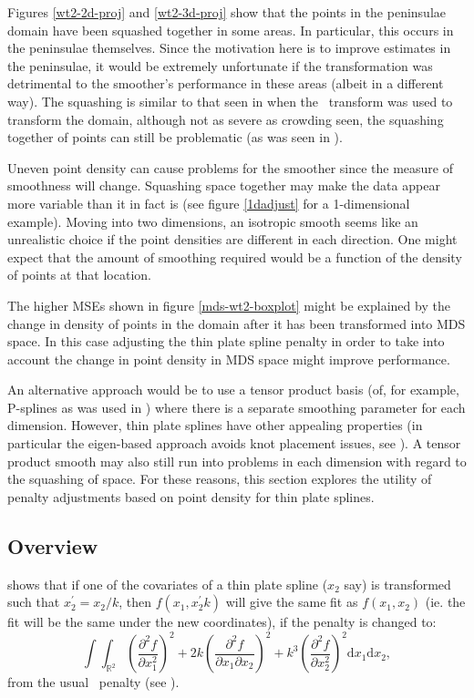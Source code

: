 Figures \ref{wt2-2d-proj} and \ref{wt2-3d-proj} show that the points in the peninsulae domain have been squashed together in some areas. In particular, this occurs in the peninsulae themselves. Since the motivation here is to improve estimates in the peninsulae, it would be extremely unfortunate if the transformation was detrimental to the smoother's performance in these areas (albeit in a different way). The squashing is similar to that seen in  when the \sch\ transform was used to transform the domain, although not as severe as crowding seen, the squashing together of points can still be problematic (as was seen in ). 

Uneven point density can cause problems for the smoother since the measure of smoothness will change.  Squashing space together may make the data appear more variable than it in fact is (see figure \ref{1dadjust} for a 1-dimensional example). Moving into two dimensions, an isotropic smooth seems like an unrealistic choice if the point densities are different in each direction. One might expect that the amount of smoothing required would be a function of the density of points at that location.

The higher MSEs shown in figure \ref{mds-wt2-boxplot} might be explained by the change in density of points in the domain after it has been transformed into MDS space. In this case adjusting the thin plate spline penalty in order to take into account the change in point density in MDS space might improve performance.

An alternative approach would be to use a tensor product basis (of, for example, P-splines as was used in ) where there is a separate smoothing parameter for each dimension. However, thin plate splines have other appealing properties (in particular the eigen-based approach avoids knot placement issues, see ). A tensor product smooth may also still run into problems in each dimension with regard to the squashing of space. For these reasons, this section explores the utility of penalty adjustments based on point density for thin plate splines.

\subsection{Overview}

 shows that if one of the covariates of a thin plate spline ($x_2$ say) is transformed such that $x_{2}^\prime=x_{2}/k$, then $f(x_1,x_2^\prime k)$ will give the same fit as $f(x_1,x_2)$ (ie. the fit will be the same under the new coordinates), if the penalty is changed to:
\begin{equation}
\int\int_{\mathbb{R}^2} \left ( \frac{\partial^2 f}{\partial x_1^2} \right )^2 + 2k\left ( \frac{\partial^2 f}{\partial x_1 \partial x_2} \right )^2 + k^3\left ( \frac{\partial^2 f}{\partial x_2^2} \right )^2 \text{d}x_1 \text{d}x_2,
\label{adjustedintegral}
\end{equation}
from the usual \tprs\ penalty (see ).

